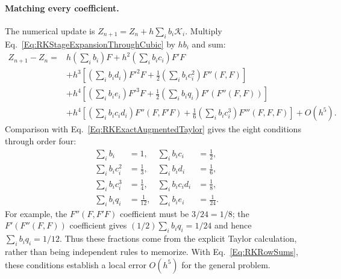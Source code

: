 \paragraph{Matching every coefficient.}
The numerical update is $Z_{n+1}=Z_n+h\sum_i b_i\mathcal K_i$.
Multiply Eq.~\ref{Eq:RKStageExpansionThroughCubic} by $hb_i$ and sum:
\begin{equation}\label{Eq:RKNumericalAugmentedTaylor}
\begin{aligned}
 Z_{n+1}-Z_n={}&h\left(\sum_i b_i\right)F
              +h^2\left(\sum_i b_ic_i\right)F'F\\
 &+h^3\left[\left(\sum_i b_id_i\right)F'^2F
                  +\frac12\left(\sum_i b_ic_i^2\right)F''(F,F)\right]\\
 &+h^4\left[\left(\sum_i b_ie_i\right)F'^3F
                  +\frac12\left(\sum_i b_iq_i\right)F'(F''(F,F))\right]\\
 &+h^4\left[\left(\sum_i b_ic_id_i\right)F''(F,F'F)
                  +\frac16\left(\sum_i b_ic_i^3\right)F'''(F,F,F)\right]
 +O(h^5).
\end{aligned}
\end{equation}
Comparison with Eq.~\ref{Eq:RKExactAugmentedTaylor} gives the eight
conditions through order four:
\begin{equation}\label{Eq:RKOrderFourConditions}
\begin{aligned}
 \sum_i b_i&=1,& \sum_i b_ic_i&=\frac12,\\
 \sum_i b_ic_i^2&=\frac13,& \sum_i b_id_i&=\frac16,\\
 \sum_i b_ic_i^3&=\frac14,& \sum_i b_ic_id_i&=\frac18,\\
 \sum_i b_iq_i&=\frac1{12},& \sum_i b_ie_i&=\frac1{24}.
\end{aligned}
\end{equation}
For example, the $F''(F,F'F)$ coefficient must be $3/24=1/8$;
the $F'(F''(F,F))$ coefficient gives
$(1/2)\sum_i b_iq_i=1/24$ and hence $\sum_i b_iq_i=1/12$.
Thus these fractions come from the explicit Taylor calculation, rather than
being independent rules to memorize. With Eq.~\ref{Eq:RKRowSums}, these
conditions establish a local error $O(h^5)$ for the general problem.

